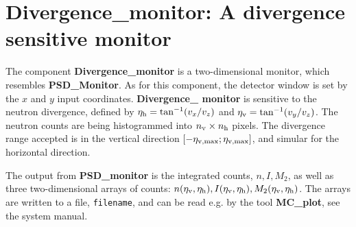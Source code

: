 
\section{Divergence\_monitor: A divergence sensitive monitor}


The component {\bf Divergence\_monitor} is a two-dimensional monitor,
which resembles {\bf PSD\_Monitor}. As for this component,
the detector window is set
by the $x$ and $y$ input coordinates.
{\bf Divergence\_ monitor} is sensitive to the neutron divergence,
defined by
$\eta_{\rm h} = \tan^{-1}(v_x/v_z)$ and $\eta_{\rm v} = \tan^{-1}(v_y/v_z)$.
The neutron counts are being histogrammed
into $n_{\rm v} \times n_{\rm h}$ pixels. 
The divergence range accepted is in the vertical direction
$[-\eta_{\rm v,max}; \eta_{\rm v,max}]$, and simular for the horizontal
direction.

The output from {\bf PSD\_monitor} is the integrated counts, $n, I, M_2$,
as well as
three two-dimensional arrays of counts: $n(\eta_{\rm v},\eta_{\rm h}),
I(\eta_{\rm v},\eta_{\rm h}), M_2(\eta_{\rm v},\eta_{\rm h})$.
The arrays are written to a file, \verb+filename+, 
and can be read e.g. by the tool {\bf MC\_plot}, see the system manual.
